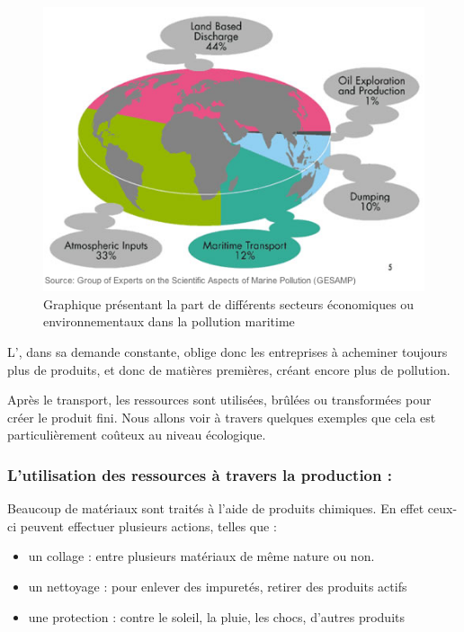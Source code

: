 \begin{figure}[h]
\centerline{\includegraphics[scale=0.75]{Rsc/pollution_maritime.png}}
\caption{Graphique présentant la part de différents secteurs économiques ou environnementaux dans la pollution maritime}
\label{PollutionMaritime}%
\end{figure}

L'\op, dans sa demande constante, oblige donc les entreprises à acheminer toujours plus de produits, et donc de matières premières, créant encore plus de pollution.

\bigbreak Après le transport, les ressources sont utilisées, brûlées ou transformées pour créer le produit fini. Nous allons voir à travers quelques exemples que cela est particulièrement coûteux au niveau écologique.


\subsubsection{L'utilisation des ressources à travers la production : }

Beaucoup de matériaux sont traités à l'aide de produits chimiques. En effet ceux-ci peuvent effectuer plusieurs actions, telles que : 
\begin{itemize}
  \item un collage : entre plusieurs matériaux de même nature ou non. 
  \item un nettoyage : pour enlever des impuretés, retirer des produits actifs
  \item une protection : contre le soleil, la pluie, les chocs, d'autres produits
\end{itemize}


